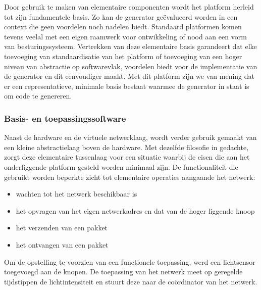 Door gebruik te maken van elementaire componenten wordt het platform herleid
tot zijn fundamentele basis. Zo kan de generator ge\"evalueerd worden in een
context die geen voordelen noch nadelen biedt. Standaard platformen komen
tevens veelal met een eigen raamwerk voor ontwikkeling of nood aan een vorm van
besturingssysteem. Vertrekken van deze elementaire basis garandeert dat elke
toevoeging van standaardisatie van het platform of toevoeging van een hoger
niveau van abstractie op softwarevlak, voordelen biedt voor de implementatie
van de generator en dit eenvoudiger maakt. Met dit platform zijn we van mening
dat er een representatieve, minimale basis bestaat waarmee de generator in
staat is om code te genereren.

\vspace{-3mm}

\subsubsection{Basis- en toepassingssoftware}
\label{subsection:eval-software}

Naast de hardware en de virtuele netwerklaag, wordt verder gebruik gemaakt van
een kleine abstractielaag boven de hardware. Met dezelfde filosofie in
gedachte, zorgt deze elementaire tussenlaag voor een situatie waarbij de eisen
die aan het onderliggende platform gesteld worden minimaal zijn. De
functionaliteit die gebruikt worden beperkte zicht tot elementaire operaties
aangaande het netwerk:

\begin{itemize}[noitemsep, topsep=0pt, partopsep=0pt]

  \item wachten tot het netwerk beschikbaar is

  \item het opvragen van het eigen netwerkadres en dat van de hoger liggende
  knoop

  \item het verzenden van een pakket
  
  \item het ontvangen van een pakket

\end{itemize}

Om de opstelling te voorzien van een functionele toepassing, werd een
lichtsensor toegevoegd aan de knopen. De toepassing van het netwerk meet op
geregelde tijdstippen de lichtintensiteit en stuurt deze naar de co\"ordinator
van het netwerk.

